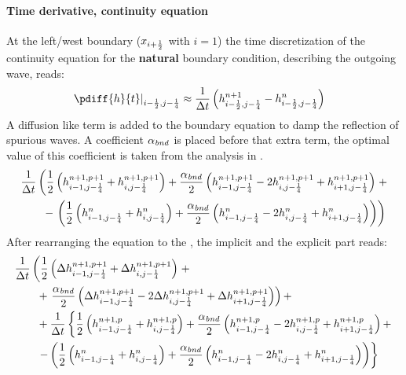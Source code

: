 \paragraph*{Time derivative, continuity equation}
At the left/west boundary ($x_{i+\frac{1}{2}}$ with $i=1$) the time discretization of the continuity equation for the \textbf{natural} boundary condition, describing the outgoing wave, reads:
\begin{align}
    \left.\pdiff{h}{t}\right|_{i-\half, j-\quart} & \approx \frac{1}{\Dt} \left(  h^{n+1}_{i-\half, j-\quart} - h^{n}_{i-\half, j-\quart} \right)
\end{align}
A diffusion like term is added to the boundary equation to damp the reflection of spurious waves.
A coefficient $\alpha_{\it bnd}$ is placed before that extra term, the optimal value of this coefficient is taken from the analysis in \citet{transpeq-analysisdiscretizationinsidedomain_boundaries.mw}.
\begin{align}
    & \frac{1}{\Delta t}\left( \frac{1}{2} \left( h^{n+1,p+1}_{i-1, j-\frac{1}{4}} + h^{n+1,p+1}_{i, j-\frac{1}{4}} \right)
    + \frac{\alpha_{\it bnd}}{2} \left( h^{n+1,p+1}_{i-1, j-\frac{1}{4}} - 2 h^{n+1,p+1}_{i, j-\frac{1}{4}} + h^{n+1,p+1}_{i+1, j-\frac{1}{4}}  \right) \right. +
    \nonumber \\*
    & \qquad  - \left. \left(
    \frac{1}{2} \left( h^{n}_{i-1, j-\frac{1}{4}} + h^{n}_{i, j-\frac{1}{4}} \right)
    + \frac{\alpha_{\it bnd}}{2}  \left( h^{n}_{i-1, j-\frac{1}{4}} - 2 h^{n}_{i, j-\frac{1}{4}} + h^{n}_{i+1, j-\frac{1}{4}}  \right) \right)
    \right)
\end{align}
After rearranging the equation to the \deltaformulation, the implicit and the explicit part reads:
\begin{align}
    & \frac{1}{\Delta t}  \left( \frac{1}{2} \left( \Delta h^{n+1, p+1}_{i-1, j-\frac{1}{4}} + \Delta h^{n+1, p+1}_{i, j-\frac{1}{4}} \right) \right. +
    \nonumber \\*
    & \qquad + \left. \frac{\alpha_{\it bnd}}{2}\left( \Delta h^{n+1,p+1}_{i-1, j-\frac{1}{4}} - 2 \Delta h^{n+1,p+1}_{i, j-\frac{1}{4}} + \Delta h^{n+1,p+1}_{i+1, j-\frac{1}{4}} \right) \right) +
    \nonumber \\
    & \qquad + \frac{1}{\Delta t} \left\{ \frac{1}{2} \left( h^{n+1, p}_{i-1, j-\frac{1}{4}} + h^{n+1, p}_{i, j-\frac{1}{4}} \right)
    + \frac{\alpha_{\it bnd}}{2}\left(  h^{n+1,p}_{i-1, j-\frac{1}{4}} - 2 h^{n+1,p}_{i, j-\frac{1}{4}}  + h^{n+1,p}_{i+1, j-\frac{1}{4}} \right) + \right.
    \nonumber \\*
    &
    \qquad \left. - \left( \frac{1}{2} \left( h^{n}_{i-1, j-\frac{1}{4}} + h^{n}_{i, j-\frac{1}{4}} \right)
    + \frac{\alpha_{\it bnd}}{2}  \left( h^{n}_{i-1, j-\frac{1}{4}} - 2 h^{n}_{i, j-\frac{1}{4}} + h^{n}_{i+1, j-\frac{1}{4}}  \right) \right) \right\}
\end{align}

